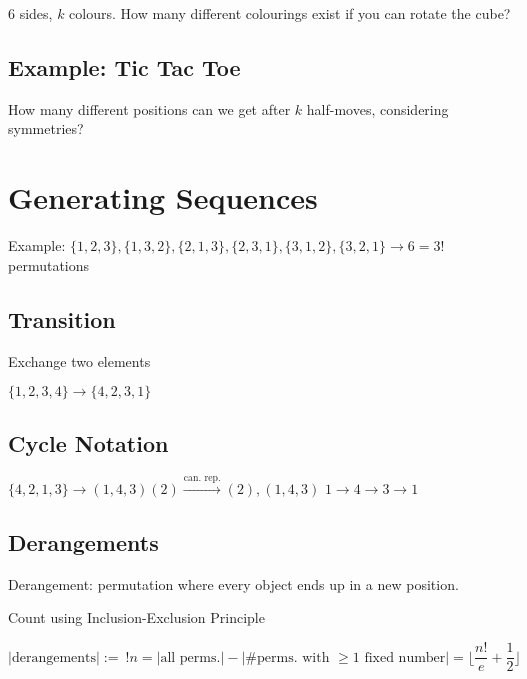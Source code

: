 \documentclass[11pt]{article}
\begin{document}
6 sides, $ k $ colours. How many different colourings exist if you can rotate the cube?

\subsection{Example: Tic Tac Toe}

How many different positions can we get after $ k $ half-moves, considering symmetries?










\section{Generating Sequences}

Example: $ \{ 1, 2, 3 \}, \{ 1, 3, 2 \}, \{ 2, 1, 3 \}, \{ 2, 3, 1 \}, \{ 3, 1, 2 \}, \{ 3, 2, 1 \} \rightarrow 6 = 3! $ permutations

\subsection{Transition}

Exchange two elements

$ \{ 1, 2, 3, 4 \} \longrightarrow \{ 4, 2, 3, 1 \} $

\subsection{Cycle Notation}

$ \{ 4, 2, 1, 3 \} \longrightarrow (1, 4, 3) (2) \overset{\text{can. rep.}}{\longrightarrow}(2), (1, 4, 3) $
$ 1 \rightarrow 4 \rightarrow 3 \rightarrow 1 $

\subsection{Derangements}

Derangement: permutation where every object ends up in a new position. \newline

Count using Inclusion-Exclusion Principle

\[ |\text{derangements} | :=~ !n = | \text{all perms.} | - | \# \text{perms. with } \geq 1 \text{ fixed number} | = \lfloor \frac{n!}{e} + \frac{1}{2} \rfloor \]
\end{document}
